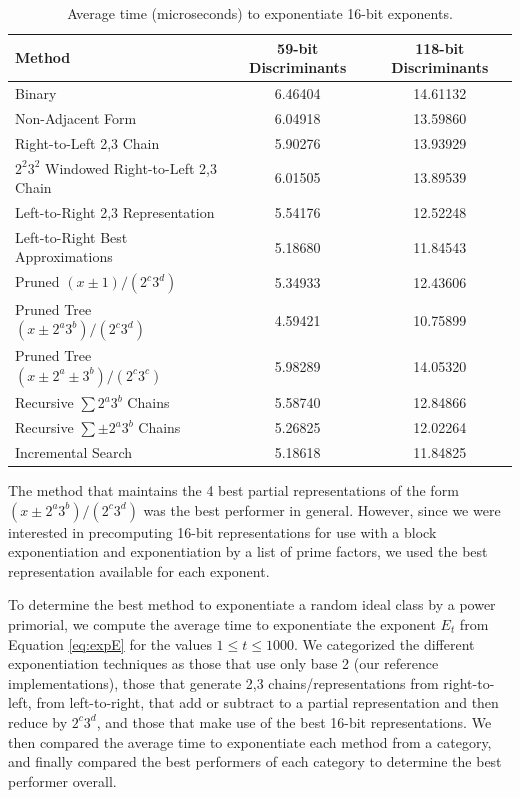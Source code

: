\documentclass{ucalgthes1}
\theoremstyle{definition}
\begin{document}
\begin{table}[htb]
\centering
\begin{tabular}{| l | c | c |}
	\hline
	Method & 59-bit Discriminants & 118-bit Discriminants \\
	\hline
	Binary & 6.46404 & 14.61132 \\
	Non-Adjacent Form & 6.04918 & 13.59860 \\
	Right-to-Left 2,3 Chain & 5.90276 & 13.93929 \\
	$2^2 3^2$ Windowed Right-to-Left 2,3 Chain & 6.01505 & 13.89539 \\
	Left-to-Right 2,3 Representation & 5.54176 & 12.52248 \\
	Left-to-Right Best Approximations & 5.18680 & 11.84543 \\
	Pruned $(x \pm 1)/(2^c3^d)$ & 5.34933 & 12.43606 \\
	Pruned Tree $(x \pm 2^a3^b)/(2^c3^d)$ & 4.59421 & 10.75899 \\
	Pruned Tree $(x \pm 2^a \pm 3^b)/(2^c3^c)$ & 5.98289 & 14.05320 \\
	Recursive $\sum 2^a3^b$ Chains & 5.58740 & 12.84866 \\
	Recursive $\sum \pm 2^a3^b$ Chains & 5.26825 & 12.02264 \\
	Incremental Search & 5.18618 & 11.84825 \\
	\hline
\end{tabular}
\caption{Average time (microseconds) to exponentiate 16-bit exponents.}
\label{tab:exp16bitTimes}
\end{table}

The method that maintains the 4 best partial representations of the form $(x \pm 2^a3^b)/(2^c3^d)$ was the best performer in general.  However, since we were interested in precomputing 16-bit representations for use with a block exponentiation and exponentiation by a list of prime factors, we used the best representation available for each exponent.

To determine the best method to exponentiate a random ideal class by a power primorial, we compute the average time to exponentiate the exponent $E_t$ from Equation \ref{eq:expE} for the values $1 \le t \le 1000$.  We categorized the different exponentiation techniques as those that use only base 2 (our reference implementations), those that generate 2,3 chains/representations from right-to-left, from left-to-right, that add or subtract to a partial representation and then reduce by $2^c3^d$, and those that make use of the best 16-bit representations.  We then compared the average time to exponentiate each method from a category, and finally compared the best performers of each category to determine the best performer overall.
\end{document}

